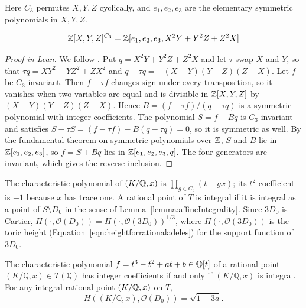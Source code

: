 \begin{equationnode}

\label{eqn:C3invariants}


\leanok

Here $C_3$ permutes $X,Y,Z$ cyclically, and $e_1,e_2,e_3$ are the elementary symmetric polynomials in $X,Y,Z$.

\begin{equation*} \mathbb{Z}[X,Y,Z]^{C_3} =\mathbb{Z}[e_1,e_2,e_3,X^2Y+Y^2Z+Z^2X] \end{equation*}

\end{equationnode}

\begin{proof}[Proof in Lean]

\leanok

We follow \cite[Example~4.6]{campbell2023permutation}. Put $q=X^2Y+Y^2Z+Z^2X$ and let $\tau$ swap $X$ and $Y$, so that $\tau q=XY^2+YZ^2+ZX^2$ and $q-\tau q=-(X-Y)(Y-Z)(Z-X)$. Let $f$ be $C_3$-invariant. Then $f-\tau f$ changes sign under every transposition, so it vanishes when two variables are equal and is divisible in $\mathbb{Z}[X,Y,Z]$ by $(X-Y)(Y-Z)(Z-X)$. Hence $B=(f-\tau f)/(q-\tau q)$ is a symmetric polynomial with integer coefficients. The polynomial $S=f-Bq$ is $C_3$-invariant and satisfies $S-\tau S=(f-\tau f)-B(q-\tau q)=0$, so it is symmetric as well. By the fundamental theorem on symmetric polynomials over $\mathbb{Z}$, $S$ and $B$ lie in $\mathbb{Z}[e_1,e_2,e_3]$, so $f=S+Bq$ lies in $\mathbb{Z}[e_1,e_2,e_3,q]$. The four generators are invariant, which gives the reverse inclusion.

\end{proof}

\begin{proposition}

\label{prop:canonicalHeight}


\leanok

The characteristic polynomial of $(K/\mathbb{Q},x)$ is $\prod_{g\in C_3}(t-gx)$; its $t^2$-coefficient is $-1$ because $x$ has trace one. A rational point of $T$ is integral if it is integral as a point of $S\setminus D_0$ in the sense of Lemma~\ref{lemma:affineIntegrality}. Since $3D_0$ is Cartier, $H(\cdot,\mathcal O(D_0))=H(\cdot,\mathcal O(3D_0))^{1/3}$, where $H(\cdot,\mathcal O(3D_0))$ is the toric height (Equation~\ref{eqn:heightforrationaladeles}) for the support function of $3D_0$.

 The characteristic polynomial $f = t^3-t^2+at+b \in \mathbb{Q}[t]$ of a rational point $(K/\mathbb Q,x) \in T(\mathbb Q)$ has integer coefficients if and only if $(K/\mathbb Q,x)$ is integral. For any integral rational point $(K/\mathbb{Q},x)$ on $T$, \begin{equation*} H((K/\mathbb Q,x),\mathcal O(D_0)) = \sqrt{1-3a}. \end{equation*} 

\end{proposition}

